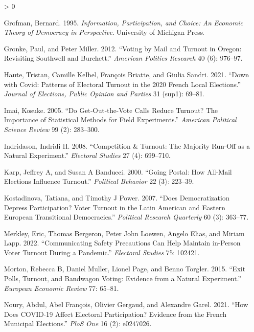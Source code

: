 \documentclass[
  12pt,
]{article}
\newlength{\cslhangindent}
\newenvironment{CSLReferences}[2] %
 {%
  \setlength{\parindent}{0pt}
  \ifodd #1 \everypar{\setlength{\hangindent}{\cslhangindent}}\ignorespaces\fi
  \ifnum #2 > 0
  \setlength{\parskip}{#2\baselineskip}
  \fi
 }%
 {}
\begin{document}
\begin{CSLReferences}{1}{0}
\leavevmode\hypertarget{ref-grofman1995information}{}%
Grofman, Bernard. 1995. \emph{Information, Participation, and Choice: An
Economic Theory of Democracy in Perspective}. University of Michigan
Press.

\leavevmode\hypertarget{ref-gronke2012voting}{}%
Gronke, Paul, and Peter Miller. 2012. {``Voting by Mail and Turnout in
Oregon: Revisiting Southwell and Burchett.''} \emph{American Politics
Research} 40 (6): 976--97.

\leavevmode\hypertarget{ref-haute2021down}{}%
Haute, Tristan, Camille Kelbel, François Briatte, and Giulia Sandri.
2021. {``Down with Covid: Patterns of Electoral Turnout in the 2020
French Local Elections.''} \emph{Journal of Elections, Public Opinion
and Parties} 31 (sup1): 69--81.

\leavevmode\hypertarget{ref-imai2005get}{}%
Imai, Kosuke. 2005. {``Do Get-Out-the-Vote Calls Reduce Turnout? The
Importance of Statistical Methods for Field Experiments.''}
\emph{American Political Science Review} 99 (2): 283--300.

\leavevmode\hypertarget{ref-indridason2008competition}{}%
Indridason, Indridi H. 2008. {``Competition \& Turnout: The Majority
Run-Off as a Natural Experiment.''} \emph{Electoral Studies} 27 (4):
699--710.

\leavevmode\hypertarget{ref-karp2000going}{}%
Karp, Jeffrey A, and Susan A Banducci. 2000. {``Going Postal: How
All-Mail Elections Influence Turnout.''} \emph{Political Behavior} 22
(3): 223--39.

\leavevmode\hypertarget{ref-kostadinova2007does}{}%
Kostadinova, Tatiana, and Timothy J Power. 2007. {``Does Democratization
Depress Participation? Voter Turnout in the Latin American and Eastern
European Transitional Democracies.''} \emph{Political Research
Quarterly} 60 (3): 363--77.

\leavevmode\hypertarget{ref-merkley2022communicating}{}%
Merkley, Eric, Thomas Bergeron, Peter John Loewen, Angelo Elias, and
Miriam Lapp. 2022. {``Communicating Safety Precautions Can Help Maintain
in-Person Voter Turnout During a Pandemic.''} \emph{Electoral Studies}
75: 102421.

\leavevmode\hypertarget{ref-morton2015exit}{}%
Morton, Rebecca B, Daniel Muller, Lionel Page, and Benno Torgler. 2015.
{``Exit Polls, Turnout, and Bandwagon Voting: Evidence from a Natural
Experiment.''} \emph{European Economic Review} 77: 65--81.

\leavevmode\hypertarget{ref-noury2021does}{}%
Noury, Abdul, Abel François, Olivier Gergaud, and Alexandre Garel. 2021.
{``How Does COVID-19 Affect Electoral Participation? Evidence from the
French Municipal Elections.''} \emph{PloS One} 16 (2): e0247026.


\end{CSLReferences}
\end{document}
